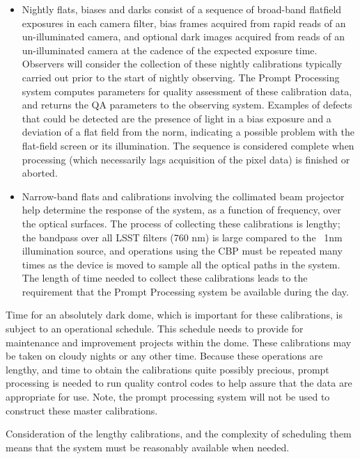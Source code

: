 \begin{itemize}

\item Nightly flats, biases and darks consist of a sequence of  broad-band
flatfield exposures in each camera filter, bias frames acquired from
rapid reads of an un-illuminated camera, and optional dark images
acquired from reads of an un-illuminated camera at the cadence of the
expected exposure time.  Observers will consider the collection of
these nightly calibrations 
typically carried out prior to the start of nightly observing.  The
Prompt Processing system computes parameters for quality assessment of
these calibration data, and returns the QA parameters to the observing
system.  Examples of defects that could be detected are the presence
of light in a bias exposure and a deviation of a flat field from the
norm, indicating a possible problem with the flat-field screen or its
illumination.  The sequence is considered complete when processing
(which necessarily lags acquisition of the pixel data) is finished or
aborted.

\item Narrow-band flats and calibrations involving the collimated beam
projector help determine the response of the system, as a function of
frequency, over the optical surfaces.  The process of collecting these
calibrations is lengthy; the bandpass over all LSST filters (760 nm)
is large compared to the ~1nm illumination source, and operations
using the CBP must be repeated many times as the device is moved to
sample all the optical paths in the system.  The length of time needed
to collect these calibrations leads to the requirement that the Prompt
Processing system be available during the day. \\

\end{itemize}

Time for an absolutely dark dome, which is important for these
calibrations, is subject to an operational schedule.  This schedule
needs to provide for maintenance and improvement projects within the
dome.  These calibrations may be taken on cloudy nights or any other
time.  Because these operations are lengthy, and time to obtain the
calibrations quite possibly precious, prompt processing is needed to
run quality control codes to help assure that the data are appropriate for
use. Note, the prompt processing system will not be used to construct
these master calibrations.

Consideration of the lengthy calibrations, and the complexity of
scheduling them means that the system must be reasonably available
when needed.


